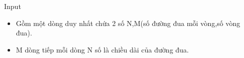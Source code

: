 Input  
\begin{itemize}
	\item     Gồm một dòng duy nhất chứa 2 số N,M(số đường đua mỗi vòng,số vòng đua).   
	\item     M dòng tiếp mỗi dòng N số là chiều dài của đường đua.   
\end{itemize}